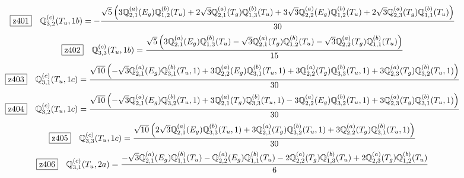 \documentclass[fleqn,10pt,landscape]{jsarticle}
\begin{document}
\begin{dmath*}
\hspace*{3mm}\fbox{z401}\quad \mathbb{Q}_{3,2}^{(c)}(T_{u},1b)=- \frac{\sqrt{5} \left(3 \mathbb{Q}_{2,1}^{(a)}(E_{g}) \mathbb{Q}_{1,2}^{(b)}(T_{u}) + 2 \sqrt{3} \mathbb{Q}_{2,1}^{(a)}(T_{g}) \mathbb{Q}_{1,3}^{(b)}(T_{u}) + 3 \sqrt{3} \mathbb{Q}_{2,2}^{(a)}(E_{g}) \mathbb{Q}_{1,2}^{(b)}(T_{u}) + 2 \sqrt{3} \mathbb{Q}_{2,3}^{(a)}(T_{g}) \mathbb{Q}_{1,1}^{(b)}(T_{u})\right)}{30}
\end{dmath*}
\begin{dmath*}
\hspace*{3mm}\fbox{z402}\quad \mathbb{Q}_{3,3}^{(c)}(T_{u},1b)=\frac{\sqrt{5} \left(3 \mathbb{Q}_{2,1}^{(a)}(E_{g}) \mathbb{Q}_{1,3}^{(b)}(T_{u}) - \sqrt{3} \mathbb{Q}_{2,1}^{(a)}(T_{g}) \mathbb{Q}_{1,2}^{(b)}(T_{u}) - \sqrt{3} \mathbb{Q}_{2,2}^{(a)}(T_{g}) \mathbb{Q}_{1,1}^{(b)}(T_{u})\right)}{15}
\end{dmath*}
\begin{dmath*}
\hspace*{3mm}\fbox{z403}\quad \mathbb{Q}_{3,1}^{(c)}(T_{u},1c)=\frac{\sqrt{10} \left(- \sqrt{3} \mathbb{Q}_{2,1}^{(a)}(E_{g}) \mathbb{Q}_{3,1}^{(b)}(T_{u},1) + 3 \mathbb{Q}_{2,2}^{(a)}(E_{g}) \mathbb{Q}_{3,1}^{(b)}(T_{u},1) + 3 \mathbb{Q}_{2,2}^{(a)}(T_{g}) \mathbb{Q}_{3,3}^{(b)}(T_{u},1) + 3 \mathbb{Q}_{2,3}^{(a)}(T_{g}) \mathbb{Q}_{3,2}^{(b)}(T_{u},1)\right)}{30}
\end{dmath*}
\begin{dmath*}
\hspace*{3mm}\fbox{z404}\quad \mathbb{Q}_{3,2}^{(c)}(T_{u},1c)=\frac{\sqrt{10} \left(- \sqrt{3} \mathbb{Q}_{2,1}^{(a)}(E_{g}) \mathbb{Q}_{3,2}^{(b)}(T_{u},1) + 3 \mathbb{Q}_{2,1}^{(a)}(T_{g}) \mathbb{Q}_{3,3}^{(b)}(T_{u},1) - 3 \mathbb{Q}_{2,2}^{(a)}(E_{g}) \mathbb{Q}_{3,2}^{(b)}(T_{u},1) + 3 \mathbb{Q}_{2,3}^{(a)}(T_{g}) \mathbb{Q}_{3,1}^{(b)}(T_{u},1)\right)}{30}
\end{dmath*}
\begin{dmath*}
\hspace*{3mm}\fbox{z405}\quad \mathbb{Q}_{3,3}^{(c)}(T_{u},1c)=\frac{\sqrt{10} \left(2 \sqrt{3} \mathbb{Q}_{2,1}^{(a)}(E_{g}) \mathbb{Q}_{3,3}^{(b)}(T_{u},1) + 3 \mathbb{Q}_{2,1}^{(a)}(T_{g}) \mathbb{Q}_{3,2}^{(b)}(T_{u},1) + 3 \mathbb{Q}_{2,2}^{(a)}(T_{g}) \mathbb{Q}_{3,1}^{(b)}(T_{u},1)\right)}{30}
\end{dmath*}
\begin{dmath*}
\hspace*{3mm}\fbox{z406}\quad \mathbb{Q}_{3,1}^{(c)}(T_{u},2a)=\frac{- \sqrt{3} \mathbb{Q}_{2,1}^{(a)}(E_{g}) \mathbb{Q}_{1,1}^{(b)}(T_{u}) - \mathbb{Q}_{2,2}^{(a)}(E_{g}) \mathbb{Q}_{1,1}^{(b)}(T_{u}) - 2 \mathbb{Q}_{2,2}^{(a)}(T_{g}) \mathbb{Q}_{1,3}^{(b)}(T_{u}) + 2 \mathbb{Q}_{2,3}^{(a)}(T_{g}) \mathbb{Q}_{1,2}^{(b)}(T_{u})}{6}
\end{dmath*}
\end{document}
